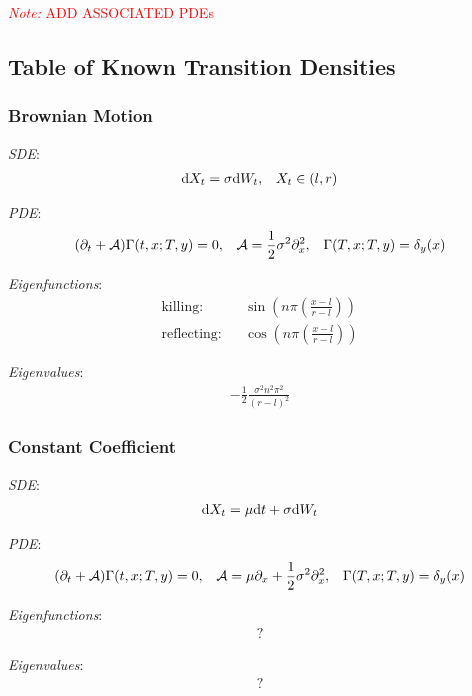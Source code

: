\documentclass[12pt]{article}
\newcommand{\note}[1]{\textcolor{red}{\textit{Note:} #1}}
\begin{document}
\note{ADD ASSOCIATED PDEs}

\subsection{Table of Known Transition Densities}
\subsubsection{Brownian Motion}
\textit{SDE}:
\begin{align*}
    \mathrm{d} X_t = \sigma \mathrm{d} W_t, && X_t\in(l,r)
\end{align*}

\textit{PDE}:
\begin{align*}
    (\partial_t + \mathcal{A}) \Gamma(t,x;T,y) = 0,&& \mathcal{A} = \frac{1}{2}\sigma^2 \partial_x^2 ,&& \Gamma(T,x;T,y) = \delta_y(x)
\end{align*}

\textit{Eigenfunctions}:
\begin{align*}
    \text{killing:} &&  \sin \left( n \pi \left( \frac{x-l}{r-l} \right) \right)\\
    \text{reflecting:} &&  \cos \left( n \pi \left( \frac{x-l}{r-l} \right) \right)
\end{align*}

\textit{Eigenvalues}:
\begin{align*}
    - \frac{1}{2} \frac{\sigma^2 n^2 \pi^2}{(r-l)^2}
\end{align*}


\subsubsection{Constant Coefficient}
\textit{SDE}:
\begin{align*}
    \mathrm{d} X_t = \mu \mathrm{d} t + \sigma \mathrm{d} W_t
\end{align*}

\textit{PDE}:
\begin{align*}
    (\partial_t + \mathcal{A}) \Gamma(t,x;T,y) = 0,&& \mathcal{A} = \mu \partial_x + \frac{1}{2}\sigma^2 \partial_x^2 ,&& \Gamma(T,x;T,y) = \delta_y(x)
\end{align*}

\textit{Eigenfunctions}:
\begin{align*}
    ?
\end{align*}

\textit{Eigenvalues}:
\begin{align*}
    ?
\end{align*}
\end{document}

